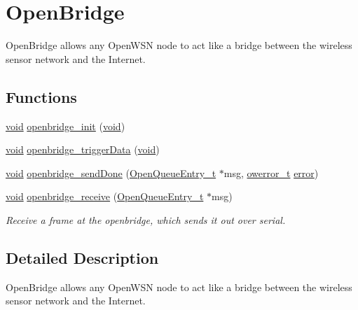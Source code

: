 \hypertarget{group___open_bridge}{}\section{Open\+Bridge}
\label{group___open_bridge}


Open\+Bridge allows any Open\+W\+SN node to act like a bridge between the wireless sensor network and the Internet.  


\subsection*{Functions}
\begin{DoxyCompactItemize}
\item 
\hyperlink{usb__devapi_8h_afabf60e7f57651d6d595a02c75f07cd0}{void} \hyperlink{group___open_bridge_ga34778c5d5b048f0db1b588bd88f3fb47}{openbridge\+\_\+init} (\hyperlink{usb__devapi_8h_afabf60e7f57651d6d595a02c75f07cd0}{void})
\item 
\hyperlink{usb__devapi_8h_afabf60e7f57651d6d595a02c75f07cd0}{void} \hyperlink{group___open_bridge_gaa9c3e5722db7e8c313d5d36c8269203e}{openbridge\+\_\+trigger\+Data} (\hyperlink{usb__devapi_8h_afabf60e7f57651d6d595a02c75f07cd0}{void})
\item 
\hyperlink{usb__devapi_8h_afabf60e7f57651d6d595a02c75f07cd0}{void} \hyperlink{group___open_bridge_ga48345d223f59957ed3b4b47ed692ef98}{openbridge\+\_\+send\+Done} (\hyperlink{struct_open_queue_entry__t}{Open\+Queue\+Entry\+\_\+t} $\ast$msg, \hyperlink{opendefs_8h_af20b7c3ed9d2ba19e56a309ad9314803}{owerror\+\_\+t} \hyperlink{disk_8c_ad018a3100b2dabad325a0800152db297}{error})
\item 
\hyperlink{usb__devapi_8h_afabf60e7f57651d6d595a02c75f07cd0}{void} \hyperlink{group___open_bridge_ga59de967f7924e1c672ada8905a54d683}{openbridge\+\_\+receive} (\hyperlink{struct_open_queue_entry__t}{Open\+Queue\+Entry\+\_\+t} $\ast$msg)
\begin{DoxyCompactList}\small\item\em Receive a frame at the openbridge, which sends it out over serial. \end{DoxyCompactList}\end{DoxyCompactItemize}


\subsection{Detailed Description}
Open\+Bridge allows any Open\+W\+SN node to act like a bridge between the wireless sensor network and the Internet. 

